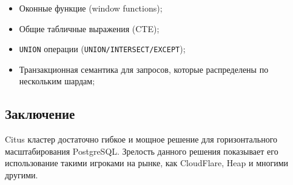\begin{itemize}
  \item Оконные функцие (window functions);
  \item Общие табличные выражения (CTE);
  \item \lstinline!UNION! операции (\lstinline!UNION/INTERSECT/EXCEPT!);
  \item Транзакционная семантика для запросов, которые распределены по нескольким шардам;
\end{itemize}



\subsection{Заключение}

Citus кластер достаточно гибкое и мощное решение для горизонтального масштабирования PostgreSQL. Зрелость данного решения показывает его использование такими игроками на рынке, как CloudFlare, Heap и многими другими.
